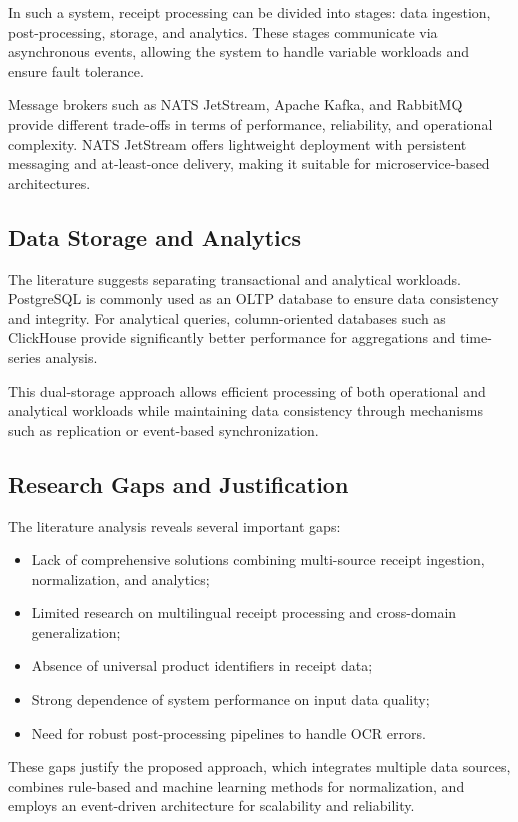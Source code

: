 In such a system, receipt processing can be divided into stages: data ingestion, post-processing, storage, and analytics. These stages communicate via asynchronous events, allowing the system to handle variable workloads and ensure fault tolerance.

Message brokers such as NATS JetStream, Apache Kafka, and RabbitMQ provide different trade-offs in terms of performance, reliability, and operational complexity. NATS JetStream offers lightweight deployment with persistent messaging and at-least-once delivery, making it suitable for microservice-based architectures.

\subsection{Data Storage and Analytics}

The literature suggests separating transactional and analytical workloads. PostgreSQL is commonly used as an OLTP database to ensure data consistency and integrity. For analytical queries, column-oriented databases such as ClickHouse provide significantly better performance for aggregations and time-series analysis.

This dual-storage approach allows efficient processing of both operational and analytical workloads while maintaining data consistency through mechanisms such as replication or event-based synchronization.

\subsection{Research Gaps and Justification}

The literature analysis reveals several important gaps:

\begin{itemize}
\item Lack of comprehensive solutions combining multi-source receipt ingestion, normalization, and analytics;
\item Limited research on multilingual receipt processing and cross-domain generalization;
\item Absence of universal product identifiers in receipt data;
\item Strong dependence of system performance on input data quality;
\item Need for robust post-processing pipelines to handle OCR errors.
\end{itemize}

These gaps justify the proposed approach, which integrates multiple data sources, combines rule-based and machine learning methods for normalization, and employs an event-driven architecture for scalability and reliability.

